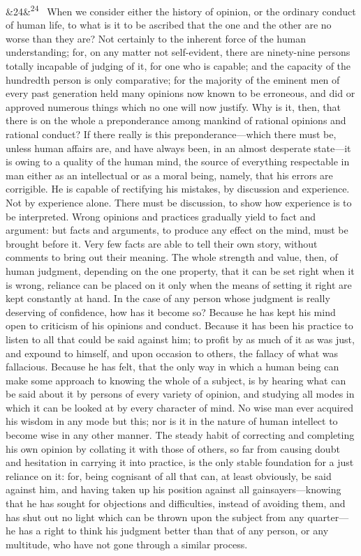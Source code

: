 \documentclass[12pt]{article}
\newcommand{\para}[1][]{\par\noindent\ifx&#1&\else\textsuperscript{\footnotesize #1}~\fi}
\begin{document}
\para[24] When we consider either the history of opinion, or the ordinary conduct of human life, to what is it to be ascribed that the one and the other are no worse than they are? Not certainly to the inherent force of the human understanding; for, on any matter not self-evident, there are ninety-nine persons totally incapable of judging of it, for one who is capable; and the capacity of the hundredth person is only comparative; for the majority of the eminent men of every past generation held many opinions now known to be erroneous, and did or approved numerous things which no one will now justify. Why is it, then, that there is on the whole a preponderance among mankind of rational opinions and rational conduct? If there really is this preponderance---which there must be, unless human affairs are, and have always been, in an almost desperate state---it is owing to a quality of the human mind, the source of everything respectable in man either as an intellectual or as a moral being, namely, that his errors are corrigible. He is capable of rectifying his mistakes, by discussion and experience. Not by experience alone. There must be discussion, to show how experience is to be interpreted. Wrong opinions and practices gradually yield to fact and argument: but facts and arguments, to produce any effect on the mind, must be brought before it. Very few facts are able to tell their own story, without comments to bring out their meaning. The whole strength and value, then, of human judgment, depending on the one property, that it can be set right when it is wrong, reliance can be placed on it only when the means of setting it right are kept constantly at hand. In the case of any person whose judgment is really deserving of confidence, how has it become so? Because he has kept his mind open to criticism of his opinions and conduct. Because it has been his practice to listen to all that could be said against him; to profit by as much of it as was just, and expound to himself, and upon occasion to others, the fallacy of what was fallacious. Because he has felt, that the only way in which a human being can make some approach to knowing the whole of a subject, is by hearing what can be said about it by persons of every variety of opinion, and studying all modes in which it can be looked at by every character of mind. No wise man ever acquired his wisdom in any mode but this; nor is it in the nature of human intellect to become wise in any other manner. The steady habit of correcting and completing his own opinion by collating it with those of others, so far from causing doubt and hesitation in carrying it into practice, is the only stable foundation for a just reliance on it: for, being cognisant of all that can, at least obviously, be said against him, and having taken up his position against all gainsayers---knowing that he has sought for objections and difficulties, instead of avoiding them, and has shut out no light which can be thrown upon the subject from any quarter---he has a right to think his judgment better than that of any person, or any multitude, who have not gone through a similar process.
\end{document}
